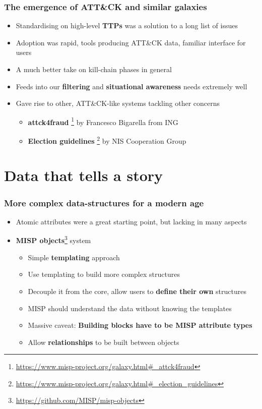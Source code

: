 \begin{frame}
  \frametitle{The emergence of ATT\&CK and similar galaxies}
  \begin{itemize}
    \item Standardising on high-level {\bf TTPs} was a solution to a long list of issues
    \item Adoption was rapid, tools producing ATT\&CK data, familiar interface for users
    \item A much better take on kill-chain phases in general
    \item Feeds into our {\bf filtering} and {\bf situational awareness} needs extremely well
    \item Gave rise to other, ATT\&CK-like systems tackling other concerns
    \begin{itemize}
      \item {\bf attck4fraud} \footnote{\url{https://www.misp-project.org/galaxy.html\#_attck4fraud}} by Francesco Bigarella from ING
      \item {\bf Election guidelines} \footnote{\url{https://www.misp-project.org/galaxy.html\#_election_guidelines}} by NIS Cooperation Group
    \end{itemize}
  \end{itemize}
\end{frame}

\section{Data that tells a story}

\begin{frame}
  \frametitle{More complex data-structures for a modern age}
  \begin{itemize}
    \item Atomic attributes were a great starting point, but lacking in many aspects
    \item {\bf MISP objects}\footnote{\url{https://github.com/MISP/misp-objects}} system
    \begin{itemize}
      \item Simple {\bf templating} approach
      \item Use templating to build more complex structures
      \item Decouple it from the core, allow users to {\bf define their own} structures
      \item MISP should understand the data without knowing the templates
      \item Massive caveat: {\bf Building blocks have to be MISP attribute types}
      \item Allow {\bf relationships} to be built between objects
    \end{itemize}
  \end{itemize}
\end{frame}

